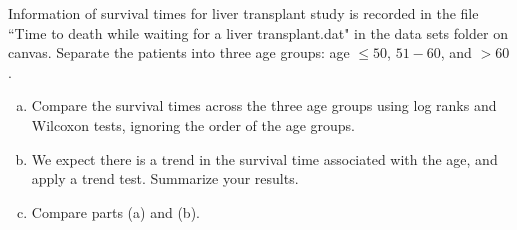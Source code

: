 \documentclass[12pt]{elegantbook}
\begin{document}
    \begin{exercise*}[3]
        Information of survival times for liver transplant study is recorded in the file ``Time to death while waiting for a liver transplant.dat" in the data sets folder on canvas. Separate the patients into three age groups: age $\leq50$, $51-60$, and $> 60$. 
        \begin{enumerate}[(a)]
            \item Compare the survival times across the three age groups using log ranks and Wilcoxon tests, ignoring the order of the age groups. 
            \item We expect there is a trend in the survival time associated with the age, and apply a trend test. Summarize your results.
            \item Compare parts (a) and (b). 
        \end{enumerate}
    \end{exercise*}
\end{document}
